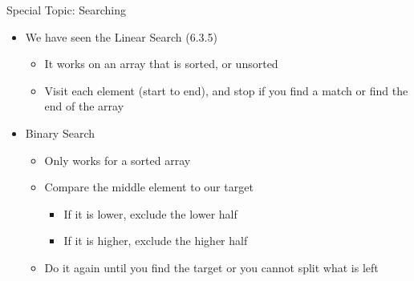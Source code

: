 \documentclass[aspectratio=43,10pt,t]{beamer}
\begin{document}
\begin{frame}{Special Topic: Searching}
  \begin{itemize}
    \item We have seen the Linear Search (6.3.5)
      \begin{itemize}
        \item It works on an array that is sorted, or unsorted
        \item Visit each element (start to end), and stop if you find a match or find the end of the array
      \end{itemize}
    \item Binary Search
      \begin{itemize}
        \item Only works for a sorted array
        \item Compare the middle element to our target
          \begin{itemize}
            \item If it is lower, exclude the lower half
            \item If it is higher, exclude the higher half
          \end{itemize}
        \item Do it again until you find the target or you cannot split what is left
      \end{itemize}
  \end{itemize}
\end{frame}
\end{document}
